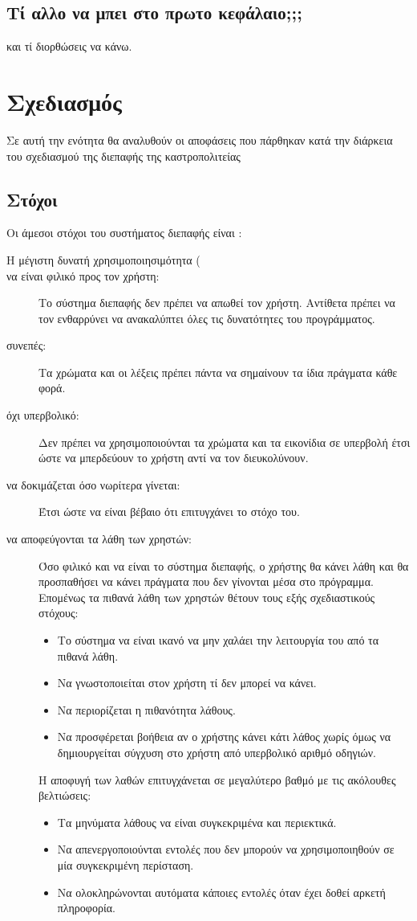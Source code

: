 \documentclass{assignment}
\begin{document}
\subsection{Τί αλλο να μπει στο πρωτο κεφάλαιο;;;}
και τί διορθώσεις να κάνω.

\section{Σχεδιασμός}

Σε αυτή την ενότητα θα αναλυθούν οι αποφάσεις που πάρθηκαν κατά την διάρκεια του σχεδιασμού της διεπαφής της καστροπολιτείας

\subsection{Στόχοι}
Οι άμεσοι στόχοι του συστήματος διεπαφής είναι \cite{class_notes}:
\begin{description}
\item [Η μέγιστη δυνατή χρησιμοποιησιμότητα (]
\item [να είναι φιλικό προς τον χρήστη:] Το σύστημα διεπαφής δεν πρέπει να απωθεί τον χρήστη. Αντίθετα πρέπει να τον ενθαρρύνει να ανακαλύπτει όλες τις δυνατότητες του προγράμματος.
\item [συνεπές:] Τα χρώματα και οι λέξεις πρέπει πάντα να σημαίνουν τα ίδια πράγματα κάθε φορά.
\item [όχι υπερβολικό:] Δεν πρέπει να χρησιμοποιούνται τα χρώματα και τα εικονίδια σε υπερβολή έτσι ώστε να μπερδεύουν το χρήστη αντί να τον διευκολύνουν.
\item [να δοκιμάζεται όσο νωρίτερα γίνεται:] Έτσι ώστε να είναι βέβαιο ότι επιτυγχάνει το στόχο του.
\item [να αποφεύγονται τα λάθη των χρηστών:] Όσο φιλικό και να είναι το σύστημα διεπαφής, ο χρήστης θα κάνει λάθη και θα προσπαθήσει να κάνει πράγματα που δεν γίνονται μέσα στο πρόγραμμα. Επομένως τα πιθανά λάθη των χρηστών θέτουν τους εξής σχεδιαστικούς στόχους:
  \begin{itemize}
  \item Το σύστημα να είναι ικανό να μην χαλάει την λειτουργία του από τα πιθανά λάθη.
  \item Να γνωστοποιείται στον χρήστη τί δεν μπορεί να κάνει.
  \item Να περιορίζεται η πιθανότητα λάθους.
  \item Να προσφέρεται βοήθεια αν ο χρήστης κάνει κάτι λάθος χωρίς όμως να δημιουργείται σύγχυση στο χρήστη από υπερβολικό αριθμό οδηγιών. 
  \end{itemize} 
Η αποφυγή των λαθών επιτυγχάνεται σε μεγαλύτερο βαθμό με τις ακόλουθες βελτιώσεις:
  \begin{itemize}
  \item Τα μηνύματα λάθους να είναι συγκεκριμένα και περιεκτικά.
  \item Να απενεργοποιούνται εντολές που δεν μπορούν να χρησιμοποιηθούν σε μία συγκεκριμένη περίσταση.
  \item Να ολοκληρώνονται αυτόματα κάποιες εντολές όταν έχει δοθεί αρκετή πληροφορία.
  \end{itemize}
\end{description}
\end{document}
